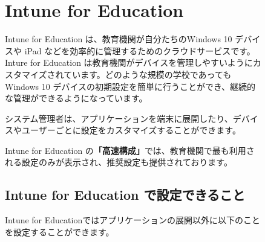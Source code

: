 \clearpage
\begin{figure}[htbp]
    \section{Intune for Education}
    \label{sec:IntuneforEducation}

    \hspace{8pt} Intune for Education は、教育機関が自分たちのWindows 10 デバイスや iPad などを効率的に管理するためのクラウドサービスです。Inture for Education は教育機関がデバイスを管理しやすいようにカスタマイズされています。どのような規模の学校であってもWindows 10 デバイスの初期設定を簡単に行うことができ、継続的な管理ができるようになっています。

    \hspace{8pt} システム管理者は、アプリケーションを端末に展開したり、デバイスやユーザーごとに設定をカスタマイズすることができます。

    \hspace{8pt} Intune for Education の\textbf{「高速構成」}では、教育機関で最も利用される設定のみが表示され、推奨設定も提供されております。
\end{figure}

\begin{figure}[htbp]
    \subsection{Intune for Education で設定できること}
    \label{sec:IntuneforEducationでできること}

    Intune for Educationではアプリケーションの展開以外に以下のことを設定することができます。
\end{figure}

